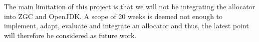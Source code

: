
The main limitation of this project is that we will not be integrating the allocator into ZGC and OpenJDK. A scope of 20 weeks is deemed not enough to implement, adapt, evaluate and integrate an allocator and thus, the latest point will therefore be considered as future work.


